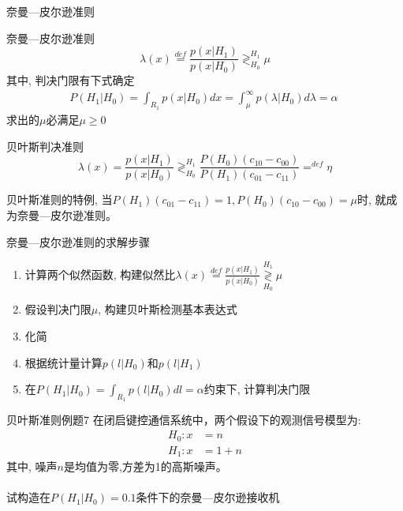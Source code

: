 \begin{frame}[shrink]{奈曼---皮尔逊准则}
\begin{block}{奈曼---皮尔逊准则}
\[ \lambda(x)\mathop{=}\limits^{def}\frac{p(x|H_1)}{p(x|H_0)}\mathop{\gtrless}_{H_0}^{H_1}\mu \]
其中, 判决门限有下式确定
\begin{align*}
P(H_1|H_0)=\int_{R_1}p(x|H_0)dx=\int_{\mu}^{\infty}p(\lambda|H_0)d\lambda=\alpha\
\end{align*}
求出的$\mu$必满足$\mu\ge 0$
\end{block}
\begin{block}{贝叶斯判决准则}
\[ \lambda(x)=\frac{p(x|H_1)}{p(x|H_0)}\mathop{\gtrless}_{H_0}^{H_1}\frac{P(H_0)(c_{10}-c_{00})}{P(H_1)(c_{01}-c_{11})}\mathop{=}^{def}\eta \]
\end{block}
贝叶斯准则的特例, 当$P(H_1)(c_{01}-c_{11})=1, P(H_0)(c_{10}-c_{00})=\mu$时, 就成为奈曼---皮尔逊准则。
\end{frame}

\begin{frame}[shrink]{奈曼---皮尔逊准则的求解步骤}
\begin{enumerate}
\setlength{\itemsep}{.5cm}
\item 计算两个似然函数, 构建似然比$\lambda(x)\mathop{=}\limits^{def}\frac{p(x|H_1)}{p(x|H_0)}\mathop{\gtrless}\limits_{H_0}^{H_1}\mu$
\item 假设判决门限$\mu$, 构建贝叶斯检测基本表达式
\item 化简
\item 根据统计量计算$p(l|H_0)$和$p(l|H_1)$
\item 在$P(H_1|H_0)=\int_{R_1}p(l|H_0)dl=\alpha$约束下, 计算判决门限
\end{enumerate}
\end{frame}

\begin{frame}{贝叶斯准则例题7}
在闭启键控通信系统中，两个假设下的观测信号模型为:
\begin{align*}
H_0: x&=n  \\
H_1: x&=1+n
\end{align*}
其中, 噪声$n$是均值为零,方差为1的高斯噪声。\\
~\\
试构造在$P(H_1|H_0)=0.1$条件下的奈曼---皮尔逊接收机
\end{frame}

